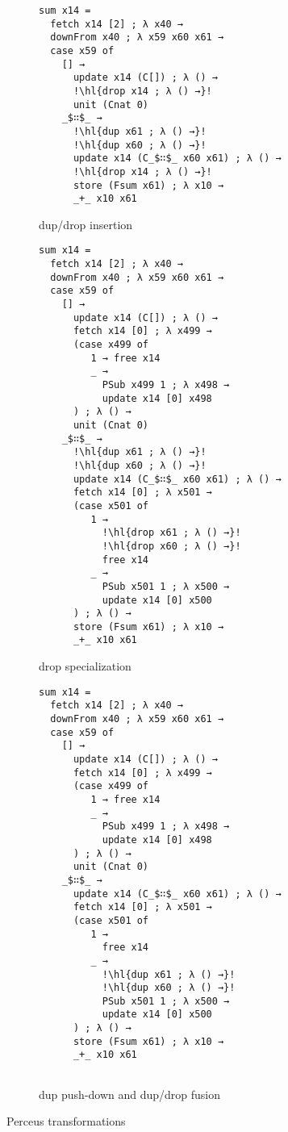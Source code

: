 \documentclass[10pt, twocolumn]{article}
\newcommand{\hl}[2][lightgray]{\colorbox{#1}{#2}}
\begin{document}
\begin{figure*}[hp]
\begin{mdframed}
\centering
\setlength{\fboxsep}{0pt} %
\begin{subfigure}[t]{0.44\textwidth}
\centering
\begin{lstlisting}
sum x14 =
  fetch x14 [2] ; λ x40 →
  downFrom x40 ; λ x59 x60 x61 →
  case x59 of
    [] →
      update x14 (C[]) ; λ () →
      !\hl{drop x14 ; λ () →}!
      unit (Cnat 0)
    _$∷$_ →
      !\hl{dup x61 ; λ () →}!
      !\hl{dup x60 ; λ () →}!
      update x14 (C_$∷$_ x60 x61) ; λ () →
      !\hl{drop x14 ; λ () →}!
      store (Fsum x61) ; λ x10 →
      _+_ x10 x61
\end{lstlisting}
\caption{dup/drop insertion}
\label{fig:drop-insert}
\end{subfigure}\par\medskip
\begin{subfigure}[b]{0.44\textwidth}
\centering
\begin{lstlisting}
sum x14 =
  fetch x14 [2] ; λ x40 →
  downFrom x40 ; λ x59 x60 x61 →
  case x59 of
    [] →
      update x14 (C[]) ; λ () →
      fetch x14 [0] ; λ x499 →
      (case x499 of
         1 → free x14
         _ →
           PSub x499 1 ; λ x498 →
           update x14 [0] x498
      ) ; λ () →
      unit (Cnat 0)
    _$∷$_ →
      !\hl{dup x61 ; λ () →}!
      !\hl{dup x60 ; λ () →}!
      update x14 (C_$∷$_ x60 x61) ; λ () →
      fetch x14 [0] ; λ x501 →
      (case x501 of
         1 →
           !\hl{drop x61 ; λ () →}!
           !\hl{drop x60 ; λ () →}!
           free x14
         _ →
           PSub x501 1 ; λ x500 →
           update x14 [0] x500
      ) ; λ () →
      store (Fsum x61) ; λ x10 →
      _+_ x10 x61
\end{lstlisting}
\caption{drop specialization}
\label{fig:drop-spec}
\end{subfigure}
\begin{subfigure}[b]{0.44\textwidth}
\begin{lstlisting}[showlines=true, numbers=none]
sum x14 =
  fetch x14 [2] ; λ x40 →
  downFrom x40 ; λ x59 x60 x61 →
  case x59 of
    [] →
      update x14 (C[]) ; λ () →
      fetch x14 [0] ; λ x499 →
      (case x499 of
         1 → free x14
         _ →
           PSub x499 1 ; λ x498 →
           update x14 [0] x498
      ) ; λ () →
      unit (Cnat 0)
    _$∷$_ →
      update x14 (C_$∷$_ x60 x61) ; λ () →
      fetch x14 [0] ; λ x501 →
      (case x501 of
         1 →
           free x14
         _ →
           !\hl{dup x61 ; λ () →}!
           !\hl{dup x60 ; λ () →}!
           PSub x501 1 ; λ x500 →
           update x14 [0] x500
      ) ; λ () →
      store (Fsum x61) ; λ x10 →
      _+_ x10 x61


\end{lstlisting}
\caption{dup push-down and dup/drop fusion}
\label{fig:dup/drop-fusion}
\end{subfigure}
\end{mdframed}
\caption{Perceus transformations}
\label{fig:perceus}
\end{figure*}
\end{document}
